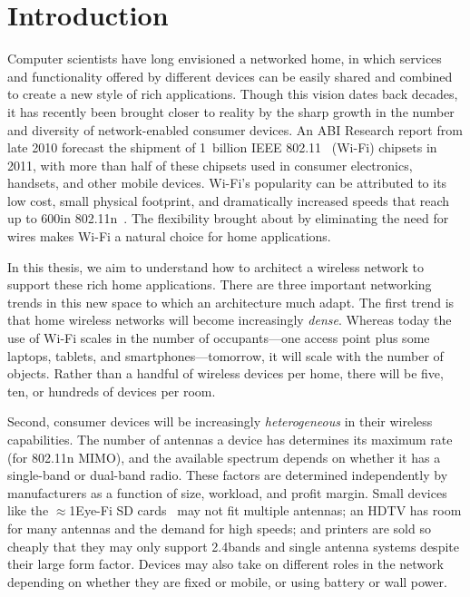 \section{Introduction}
\label{sec:intro}

Computer scientists have long envisioned a networked home, in which services and functionality offered by different devices can be easily shared and combined to create a new style of rich applications. Though this vision dates back decades, it has recently been brought closer to reality by the sharp growth in the number and diversity of network-enabled consumer devices. An ABI Research report from late 2010 forecast the shipment of 1~billion IEEE 802.11~\cite{80211} (Wi-Fi) chipsets in 2011, with more than half of these chipsets used in consumer electronics, handsets, and other mobile devices. Wi-Fi's popularity can be attributed to its low cost, small physical footprint, and dramatically increased speeds that reach up to 600\Mbps in 802.11n~\cite{80211n}. The flexibility brought about by eliminating the need for wires makes Wi-Fi a natural choice for home applications.

In this thesis, we aim to understand how to architect a wireless network to support these rich home applications. There are three important networking trends in this new space to which an architecture much adapt. The first trend is that home wireless networks will become increasingly \emph{dense}. Whereas today the use of Wi-Fi scales in the number of occupants---one access point plus some laptops, tablets, and smartphones---tomorrow, it will scale with the number of objects. Rather than a handful of wireless devices per home, there will be five, ten, or hundreds of devices per room.

Second, consumer devices will be increasingly \emph{heterogeneous} in their wireless capabilities. The number of antennas a device has determines its maximum rate (for 802.11n MIMO), and the available spectrum depends on whether it has a single-band or dual-band radio. These factors are determined independently by manufacturers as a function of size, workload, and profit margin. Small devices like the $\approx$1\insq Eye-Fi SD cards~\cite{eyefi} may not fit multiple antennas; an HDTV has room for many antennas and the demand for high speeds; and printers are sold so cheaply that they may only support 2.4\GHz bands and single antenna systems despite their large form factor. Devices may also take on different roles in the network depending on whether they are fixed or mobile, or using battery or wall power.

